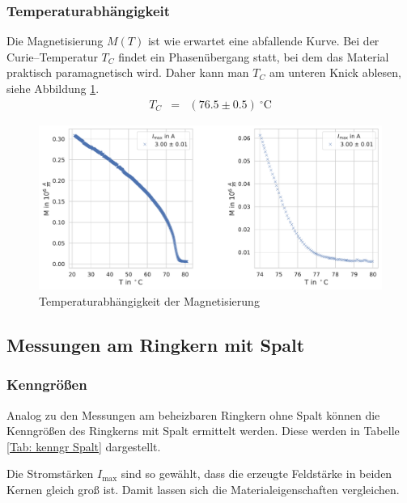 \documentclass[12pt,a4paper]{scrartcl}
\numberwithin{equation}{section} %
\begin{document}
\hypertarget{temperaturabhuxe4ngigkeit-1}{%
\subsubsection{Temperaturabhängigkeit}\label{temperaturabhuxe4ngigkeit-1}}
Die Magnetisierung $M(T)$ ist wie erwartet eine abfallende Kurve. Bei der Curie--\linebreak Temperatur $T_C$ findet ein Phasenübergang statt, bei dem das Material praktisch paramagnetisch wird. Daher kann man $T_C$ am unteren Knick ablesen, siehe Abbildung \ref{Abb: Temperatur}.
\begin{eqnarray*}
    T_C &=& (76.5 \pm 0.5) \ ^\circ\mathrm C
\end{eqnarray*}

\begin{figure}[ht]
\centering
\includegraphics[scale=0.5]{../media/B2.4/3.3.3.pdf}
\caption{Temperaturabhängigkeit der Magnetisierung}
\label{Abb: Temperatur}
\end{figure}

\hypertarget{messungen-am-ringkern-mit-spalt-1}{%
\subsection{Messungen am Ringkern mit Spalt}\label{messungen-am-ringkern-mit-spalt-1}}

\hypertarget{kenngruxf6uxdfen-1}{%
\subsubsection{Kenngrößen}\label{kenngruxf6uxdfen-1}}
Analog zu den Messungen am beheizbaren Ringkern ohne Spalt können die Kenngrößen des Ringkerns mit Spalt ermittelt werden. Diese werden in Tabelle \ref{Tab: kenngr Spalt} dargestellt.

Die Stromstärken $I_\mathrm{max}$ sind so gewählt, dass die erzeugte Feldstärke in beiden Kernen gleich groß ist. Damit lassen sich die Materialeigenschaften vergleichen.
\end{document}
